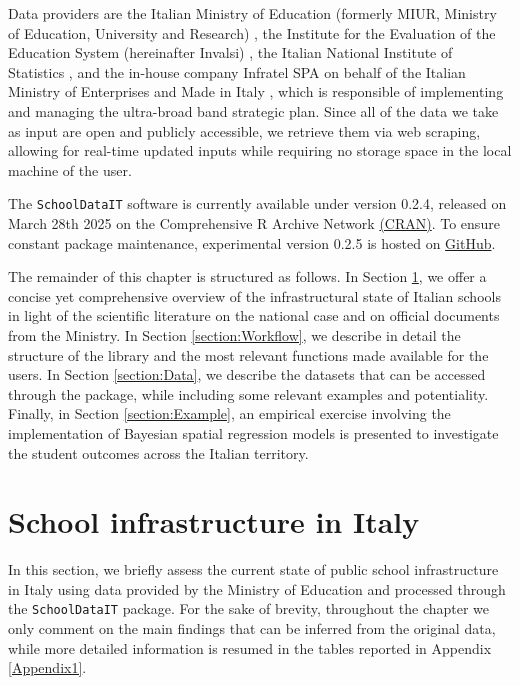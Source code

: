 \documentclass[openany]{book}
\begin{document}
Data providers are the Italian Ministry of Education (formerly MIUR, Ministry of Education, University and Research) \citep{MIUR}, the Institute for the Evaluation of the Education System (hereinafter Invalsi) \citep{Invalsi_IS}, the Italian National Institute of Statistics \citep[ISTAT,][]{InnerAreas, Situas, Shapefiles}, and the in-house company Infratel SPA on behalf of the Italian Ministry of Enterprises and Made in Italy \citep[MIMIT,][]{BB}, which is responsible of implementing and managing the ultra-broad band strategic plan. Since all of the data we take as input are open and publicly accessible, we retrieve them via web scraping, allowing for real-time updated inputs while requiring no storage space in the local machine of the user.


The \texttt{SchoolDataIT} software is currently available under version 0.2.4, released on March 28th 2025 on the Comprehensive R Archive Network \href{https://cran.r-project.org/web/packages/SchoolDataIT/index.html}{(CRAN)}. To ensure constant package maintenance, experimental version 0.2.5 is hosted on \href{https://github.com/lcef97/SchoolDataIT}{GitHub}.

The remainder of this chapter is structured as follows. In Section \ref{section:SchoolDataIT:Overview}, we offer a concise yet comprehensive overview of the infrastructural state of Italian schools in light of the scientific literature on the national case and on official documents from the Ministry. In Section \ref{section:Workflow}, we describe in detail the structure of the library and the most relevant functions made available for the users. In Section \ref{section:Data}, we describe the datasets that can be accessed through the package, while including some relevant examples and potentiality. Finally, in Section \ref{section:Example}, an empirical exercise involving the implementation of Bayesian spatial regression models is presented to investigate the student outcomes across the Italian territory.


\section{School infrastructure in Italy} \label{section:SchoolDataIT:Overview}


In this section, we briefly assess the current state of public school infrastructure in Italy using data provided by the Ministry of Education and processed through the \texttt{SchoolDataIT} package. For the sake of brevity, throughout the chapter we only comment on the main findings that can be inferred from the original data, while more detailed information is resumed in the tables reported in Appendix \ref{Appendix1}.
\end{document}
